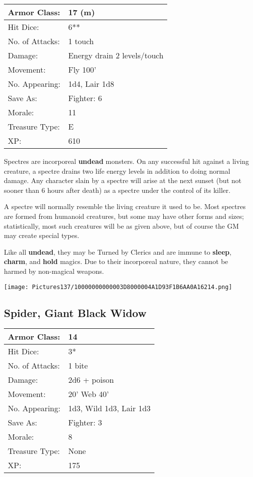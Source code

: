 \documentclass[a4paper,twoside,openany,10pt]{book}
\begin{document}
\begin{multicols}{2}
\begin{tabularx}{0.50\textwidth}{@{}lX@{}}
Armor Class: & 17 (m) \\\hline
Hit Dice: & 6** \\\hline
No. of Attacks: & 1 touch \\\hline
Damage: & Energy drain 2 levels/touch \\\hline
Movement: & Fly 100' \\\hline
No. Appearing: & 1d4, Lair 1d8 \\\hline
Save As: & Fighter: 6 \\\hline
Morale: & 11 \\\hline
Treasure Type: & E \\\hline
XP: & 610 \\\hline
\end{tabularx}\medskip

Spectres are incorporeal \textbf{undead} monsters. On any successful hit against a living creature, a spectre drains two life energy levels in addition to doing normal damage. Any character slain by a spectre will arise at the next sunset (but not sooner than 6 hours after death) as a spectre under the control of its killer.

A spectre will normally resemble the living creature it used to be. Most spectres are formed from humanoid creatures, but some may have other forms and sizes; statistically, most such creatures will be as given above, but of course the GM may create special types.

Like all \textbf{undead}, they may be Turned by Clerics and are immune to \textbf{sleep}, \textbf{charm},\textbf{ }and \textbf{hold} magics. Due to their incorporeal nature, they cannot be harmed by non-magical weapons.

\begin{center} \texttt{[image: Pictures137/10000000000003D8000004A1D93F1B6AA0A16214.png]} \end{center}


\subsection*{Spider, Giant Black Widow}\label{spider-giant-black-widow}

\begin{tabularx}{0.50\textwidth}{@{}lX@{}}
Armor Class: & 14 \\\hline
Hit Dice: & 3* \\\hline
No. of Attacks: & 1 bite \\\hline
Damage: & 2d6 + poison \\\hline
Movement: & 20' Web 40' \\\hline
No. Appearing: & 1d3, Wild 1d3, Lair 1d3 \\\hline
Save As: & Fighter: 3 \\\hline
Morale: & 8 \\\hline
Treasure Type: & None \\\hline
XP: & 175 \\\hline
\end{tabularx}\medskip


\end{multicols}
\end{document}
